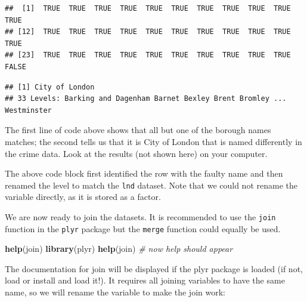 \documentclass[]{article}
\newenvironment{Shaded}{}{}
\newcommand{\KeywordTok}[1]{\textcolor[rgb]{0.00,0.44,0.13}{\textbf{{#1}}}}
\newcommand{\DecValTok}[1]{\textcolor[rgb]{0.25,0.63,0.44}{{#1}}}
\newcommand{\CommentTok}[1]{\textcolor[rgb]{0.38,0.63,0.69}{\textit{{#1}}}}
\newcommand{\NormalTok}[1]{{#1}}
\begin{document}
\begin{Shaded}
\end{Shaded}
\begin{verbatim}
##  [1]  TRUE  TRUE  TRUE  TRUE  TRUE  TRUE  TRUE  TRUE  TRUE  TRUE  TRUE
## [12]  TRUE  TRUE  TRUE  TRUE  TRUE  TRUE  TRUE  TRUE  TRUE  TRUE  TRUE
## [23]  TRUE  TRUE  TRUE  TRUE  TRUE  TRUE  TRUE  TRUE  TRUE  TRUE FALSE
\end{verbatim}
\begin{Shaded}
\end{Shaded}
\begin{verbatim}
## [1] City of London
## 33 Levels: Barking and Dagenham Barnet Bexley Brent Bromley ... Westminster
\end{verbatim}
The first line of code above shows that all but one of the borough names
matches; the second tells us that it is City of London that is named
differently in the crime data. Look at the results (not shown here) on
your computer.

\begin{Shaded}
\end{Shaded}
The above code block first identified the row with the faulty name and
then renamed the level to match the \texttt{lnd} dataset. Note that we
could not rename the variable directly, as it is stored as a factor.

We are now ready to join the datasets. It is recommended to use the
\texttt{join} function in the \texttt{plyr} package but the
\texttt{merge} function could equally be used.

\begin{Shaded}
\begin{Highlighting}[]
\KeywordTok{help}\NormalTok{(join)}
\KeywordTok{library}\NormalTok{(plyr)}
\KeywordTok{help}\NormalTok{(join)  }\CommentTok{# now help should appear}
\end{Highlighting}
\end{Shaded}
The documentation for join will be displayed if the plyr package is
loaded (if not, load or install and load it!). It requires all joining
variables to have the same name, so we will rename the variable to make
the join work:
\end{document}
